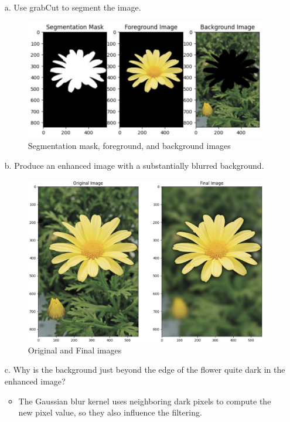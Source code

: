 \documentclass[12pt,a4paper]{article}
\begin{document}
    \begin{enumerate}
        \item[a.] Use grabCut to segment the image.

        
        
            \begin{figure}[H]
                \centering
                \includegraphics[width=0.5\linewidth]{images/Screenshots/9a.png}
                \caption{Segmentation mask, foreground, and background images}
                \label{fig:enter-label}
            \end{figure}

    \item[b.]  Produce an enhanced image with a substantially blurred background.

    
        \begin{figure}[H]
            \centering
            \includegraphics[width=0.4\linewidth]{images/Screenshots/9b.png}
            \caption{Original and Final images}
            \label{fig:enter-label}
        \end{figure}

    \item[c.] Why is the background just beyond the edge of the flower quite dark in the enhanced image?

    \begin{itemize}
        \item The Gaussian blur kernel uses neighboring dark pixels to compute the new pixel value, so they also influence the filtering.
        
    \end{itemize}
        
    
    \end{enumerate}
    
\end{document}
